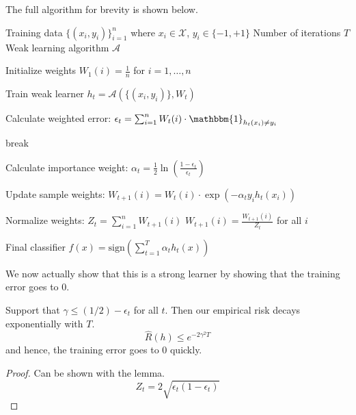 \documentclass{article}
\begin{document}
        \begin{algo}
          The full algorithm for brevity is shown below. 
          \begin{algorithm}[H]
            \label{alg:adaboost}
            \begin{algorithmic}[1]
              \Require Training data $\{(x_i, y_i)\}_{i=1}^n$ where $x_i \in \mathcal{X}$, $y_i \in \{-1, +1\}$
              \Require Number of iterations $T$
              \Require Weak learning algorithm $\mathcal{A}$

              \State Initialize weights $W_1(i) = \frac{1}{n}$ for $i = 1,\ldots,n$

                \State Train weak learner $h_t = \mathcal{A}(\{(x_i, y_i)\}, W_t)$
                
                \State Calculate weighted error:
                \State $\epsilon_t = \sum_{i=1}^n W_t(i) \cdot \mathbbm{1}_{h_t(x_i) \neq y_i}$
                
                    \State break
                \EndIf
                
                \State Calculate importance weight:
                \State $\alpha_t = \frac{1}{2} \ln(\frac{1-\epsilon_t}{\epsilon_t})$
                
                \State Update sample weights:
                    \State $W_{t+1}(i) = W_t(i) \cdot \exp(-\alpha_t y_i h_t(x_i))$
                \EndFor
                
                \State Normalize weights:
                \State $Z_t = \sum_{i=1}^n W_{t+1}(i)$
                \State $W_{t+1}(i) = \frac{W_{t+1}(i)}{Z_t}$ for all $i$
              \EndFor

              \State \Return Final classifier $f(x) = \text{sign}\left(\sum_{t=1}^T \alpha_t h_t(x)\right)$
            \end{algorithmic}
          \end{algorithm}
        \end{algo}

        We now actually show that this is a strong learner by showing that the training error goes to $0$. 

        \begin{theorem}
          Support that $\gamma \leq (1/2) - \epsilon_t$ for all $t$. Then our empirical risk decays exponentially with $T$. 
          \begin{equation}
            \hat{R} (h) \leq e^{-2 \gamma^2 T}
          \end{equation}
          and hence, the training error goes to $0$ quickly. 
        \end{theorem}
        \begin{proof}
          Can be shown with the lemma. 
          \begin{equation}
            Z_t = 2 \sqrt{\epsilon_t (1 - \epsilon_t)}
          \end{equation}
        \end{proof}
\end{document}
